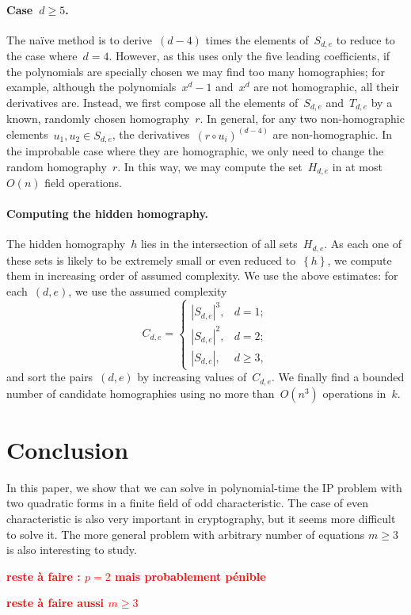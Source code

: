 \documentclass{lms}%
\def\acco#1{\left\{#1\right\}}
\def\abs#1{\left|#1\right|}
\def\card#1{\abs{#1}}
\def\commentaire#1{{\bfseries\textcolor{red}{#1}}}
\begin{document}
\paragraph{Case~$d ≥ 5$.} The naïve method is to derive~$(d-4)$ times the
elements of~$S_{d,e}$ to reduce to the case where~$d = 4$. However, as
this uses only the five leading coefficients, if the polynomials are
specially chosen we may find too many homographies; for example, although
the polynomials~$x^d-1$ and~$x^d$ are not homographic, all their
derivatives are. Instead, we first compose all the elements of~$S_{d,e}$
and~$T_{d,e}$ by a known, randomly chosen homography~$r$. In general, for
any two non-homographic elements~$u_1, u_2 ∈ S_{d,e}$, the
derivatives~$(r ∘ u_i)^{(d-4)}$ are non-homographic. In the improbable
case where they are homographic, we only need to change the random
homography~$r$. In this way, we may compute the set~$H_{d,e}$ in at
most~$O(n)$ field operations.

\paragraph{Computing the hidden homography.}

The hidden homography~$h$ lies in the intersection of all sets~$H_{d,e}$.
As each one of these sets is likely to be extremely small or even reduced
to~$\acco{h}$, we compute them in increasing order of assumed complexity.
We use the above estimates: for each~$(d,e)$, we use the assumed complexity
\begin{equation}
C_{d,e} = \begin{cases}
\card{S_{d,e}}^3,& d = 1;\\
\card{S_{d,e}}^2,& d = 2;\\
\card{S_{d,e}},& d≥ 3,
\end{cases}
\end{equation}
and sort the pairs~$(d,e)$ by increasing values of~$C_{d,e}$. We finally
find a bounded number of candidate homographies using no more
than~$O(n^3)$ operations in~$k$.

\section*{Conclusion}
In this paper, we show that we can solve in polynomial-time the IP problem with two quadratic forms in a finite field 
of odd characteristic. The case of even characteristic is also very important in cryptography, but it seems more difficult
to solve it. The more general problem with arbitrary number of equations $m ≥3$ is also interesting to study. 


\commentaire{reste à faire : $p = 2$ mais probablement pénible}

\commentaire{reste à faire aussi $m ≥ 3$}



\end{document}
